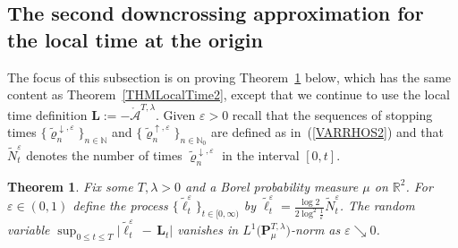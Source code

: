 \documentclass[10pt]{article}
\numberwithin{equation}{section}
\newtheorem{theorem}{Theorem}[section]
\theoremstyle{definition}
\newcommand{\R}{{\mathbb R}}
\begin{document}
\subsection{The second downcrossing approximation for the  local time  at the origin}\label{SubsectionDowncrossing2}
The focus of this subsection is on proving Theorem~\ref{ThmLocalTime3} below, which has the same content as Theorem~\ref{THMLocalTime2}, except that we continue to use the local time  definition $\mathbf{L}:=-\mathring{\mathcal{A}}^{T,\lambda}$. Given $\varepsilon>0$ recall that the sequences of stopping times $\{ \widetilde{\varrho}_{n}^{\downarrow,\varepsilon} \}_{n\in \mathbb{N}} $ and  $\{ \widetilde{\varrho}_{n}^{\uparrow,\varepsilon} \}_{n\in \mathbb{N}_0} $ are defined as in~(\ref{VARRHOS2}) and that $\widetilde{N}_{t}^{\varepsilon}$ denotes the number of times $ \widetilde{\varrho}_{n}^{\downarrow,\varepsilon} $ in the interval $[0,t]$. 
\begin{theorem}\label{ThmLocalTime3} Fix some $T,\lambda > 0$ and  a Borel probability measure $\mu$ on $\R^2$. For $\varepsilon\in (0,1)$ define the process $\{\widetilde{\ell}_t^{\varepsilon}\}_{t\in [0,\infty)}  $ by $ \widetilde{\ell}_t^{\varepsilon}= \frac{\log 2}{2\log^2\frac{1}{\varepsilon}  }\widetilde{N}_{t}^{\varepsilon} $.   The random variable $\sup_{0\leq t\leq T}\big|  \widetilde{\ell}_t^{\varepsilon}\,-\,\mathbf{L}_{t} \big|  $  vanishes in $L^1\big(\mathbf{P}^{T,\lambda}_{\mu}\big)$-norm as $\varepsilon \searrow 0$.
\end{theorem}
 
\end{document}
